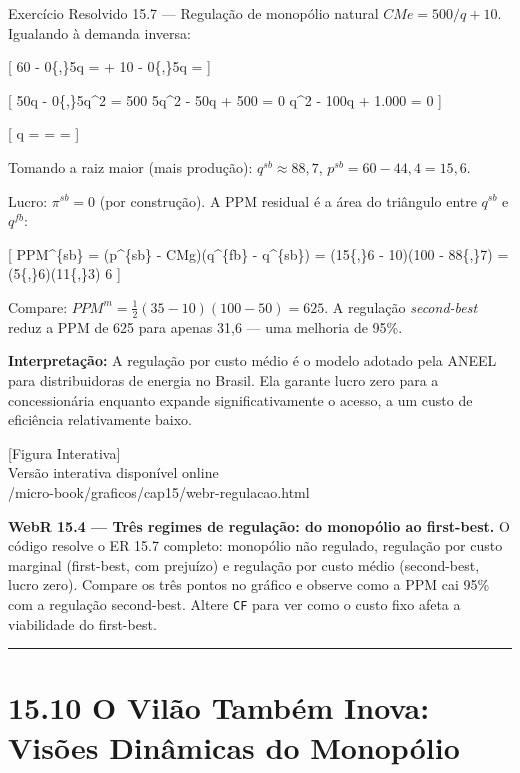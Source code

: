\documentclass[11pt,twoside,openright]{book}
\newcommand{\figurePlaceholder}[1]{%
  \begin{center}
    \begin{tcolorbox}[
      width=0.85\textwidth,
      colback=graybg,
      colframe=gray,
      boxrule=0.5pt,
      arc=2pt,
      halign=center,
      valign=center,
      height=5cm
    ]
      \centering
      \vfill
      {\sffamily\color{gray}\large [Figura Interativa]}\\[6pt]
      {\sffamily\small\color{gray} Versão interativa disponível online}\\[4pt]
      {\ttfamily\tiny\color{gray} #1}
      \vfill
    \end{tcolorbox}
  \end{center}
}
\begin{document}
\begin{exresolvidobox}{Exercício Resolvido 15.7 — Regulação de monopólio natural}
\(CMe = 500/q + 10\). Igualando à demanda inversa:

{[} 60 - 0\{,\}5q =  + 10  - 0\{,\}5q =
 {]}

{[} 50q - 0\{,\}5q\^{}2 = 500 5q\^{}2 - 50q + 500 = 0
\implies q\^{}2 - 100q + 1.000 = 0 {]}

{[} q =  =
 =  {]}

Tomando a raiz maior (mais produção): \(q^{sb} \approx 88{,}7\),
\(p^{sb} = 60 - 44{,}4 = 15{,}6\).

Lucro: \(\pi^{sb} = 0\) (por construção). A PPM residual é a área do
triângulo entre \(q^{sb}\) e \(q^{fb}\):

{[} PPM\^{}\{sb\} = (p\^{}\{sb\} - CMg)(q\^{}\{fb\} -
q\^{}\{sb\}) = (15\{,\}6 - 10)(100 - 88\{,\}7) =
(5\{,\}6)(11\{,\}3) 6 {]}

Compare: \(PPM^m = \frac{1}{2}(35-10)(100-50) = 625\). A regulação
\emph{second-best} reduz a PPM de 625 para apenas 31,6 --- uma melhoria
de 95\%.

\textbf{Interpretação:} A regulação por custo médio é o modelo adotado
pela ANEEL para distribuidoras de energia no Brasil. Ela garante lucro
zero para a concessionária enquanto expande significativamente o acesso,
a um custo de eficiência relativamente baixo.

\end{exresolvidobox}

\figurePlaceholder{/micro-book/graficos/cap15/webr-regulacao.html}

\textbf{WebR 15.4 --- Três regimes de regulação: do monopólio ao
first-best.} O código resolve o ER 15.7 completo: monopólio não
regulado, regulação por custo marginal (first-best, com prejuízo) e
regulação por custo médio (second-best, lucro zero). Compare os três
pontos no gráfico e observe como a PPM cai 95\% com a regulação
second-best. Altere \texttt{CF} para ver como o custo fixo afeta a
viabilidade do first-best.

\begin{center}\rule{0.5\linewidth}{0.5pt}\end{center}

\section{15.10 O Vilão Também Inova: Visões Dinâmicas do
Monopólio}\label{1510}
\end{document}
